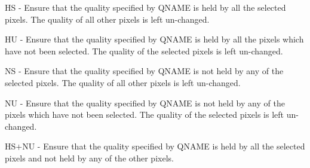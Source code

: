 \documentclass[11pt,nolof,noabs]{starlink}
\begin{document}
\begin{small}
{{{         HS - Ensure that the quality specified by QNAME is held by
              all the selected pixels. The quality of all other
              pixels is left un-changed.

         HU - Ensure that the quality specified by QNAME is held by all
              the pixels which have not been selected. The quality of
              the selected pixels is left un-changed.

         NS - Ensure that the quality specified by QNAME is not held by
              any of the selected pixels. The quality of all other
              pixels is left un-changed.

         NU - Ensure that the quality specified by QNAME is not held by
              any of the pixels which have not been selected. The
              quality of the selected pixels is left un-changed.

         HS$+$NU - Ensure that the quality specified by QNAME is held by
              all the selected pixels and not held by any of the other
              pixels.

}}}
\end{small}
\end{document}
